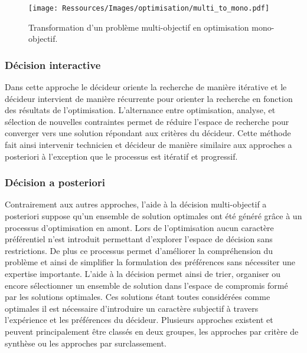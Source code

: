 \begin{figure}
    \begin{center}
        \texttt{[image: Ressources/Images/optimisation/multi\_to\_mono.pdf]}
    \end{center}
    \caption{Transformation d’un problème multi-objectif en optimisation mono-objectif.
             \label{fig:multi_to_mono}}
\end{figure}


\subsubsection{Décision interactive} %
\label{ssub:decision_interactive}
Dans cette approche le décideur oriente la recherche de manière itérative et le décideur
intervient de manière récurrente pour orienter la recherche
en fonction des résultats de l’optimisation. L’alternance entre optimisation,
analyse, et sélection de nouvelles contraintes permet de réduire l’espace de
recherche pour converger vers une solution répondant aux critères du décideur.
Cette méthode fait ainsi intervenir technicien et décideur de manière similaire
aux approches a posteriori à l’exception que le processus est itératif et progressif.




\subsubsection{Décision a posteriori} %
\label{ssub:decision_a_posteriori}
Contrairement aux autres approches, l’aide à la décision multi-objectif a posteriori
suppose qu’un ensemble de solution optimales ont été généré grâce à un processus
d’optimisation en amont. Lors de l’optimisation aucun caractère préférentiel
n’est introduit permettant d’explorer l’espace de décision sans restrictions.
De plus ce processus permet d’améliorer la compréhension du problème et ainsi
de simplifier la formulation des préférences sans nécessiter une expertise importante.
L’aide à la décision permet ainsi de trier, organiser ou encore sélectionner un
ensemble de solution dans l’espace de compromis formé par les solutions optimales.
Ces solutions étant toutes considérées comme optimales il est nécessaire d’introduire
un caractère subjectif à travers l’expérience et les préférences du décideur.
Plusieurs approches existent et peuvent principalement être classés en deux groupes,
les approches par critère de synthèse ou les approches par surclassement.



